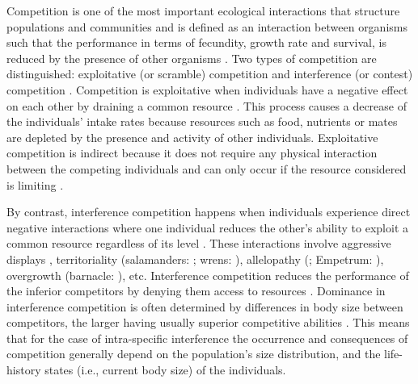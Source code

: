 Competition is one of the most important ecological interactions that structure
populations and communities and is defined as an interaction between organisms
such that the performance in terms of fecundity, growth rate and survival, is
reduced by the presence of other organisms
\autocite{volterra1931a,gause1932a,park1948a,park1954a,park1957a}. Two types of
competition are distinguished:
exploitative (or scramble) competition and interference (or contest) competition
\autocite{park1954a,park1962a,begon2009a}. Competition is exploitative when
individuals have a negative effect on each other by draining a common resource
\autocite{goss-custard1980a,vance1984a,begon2009a}. This process causes a
decrease of the individuals’ intake rates because resources such as food,
nutrients or mates \autocite{begon2009a} are depleted by the presence and activity
of other individuals. Exploitative competition is indirect because it does not
require any physical interaction between the competing individuals and can only
occur if the resource considered is limiting \autocite{begon2009a}.

By contrast, interference competition happens when individuals experience direct
negative interactions where one individual reduces the other’s ability to
exploit a common resource regardless of its level
\autocite{park1954a,vance1984a}.
These interactions involve aggressive displays \autocite{schoener1976a},
territoriality (salamanders: \textcite{walls1990a}; wrens:
\textcite{kennedy1996a}), allelopathy (\textcite{harper1977a,rice1984a};
Empetrum: \textcite{nilsson1994a}), overgrowth (barnacle:
\textcite{connell1961a,paine1966a}), etc.
Interference competition reduces the performance of the inferior competitors by
denying them access to resources \autocite{schoener1983a,thompson1993a}.
Dominance in interference competition is often determined by differences in body
size between competitors, the larger having usually superior competitive
abilities \autocite{mccormick2012a}. This means that for the case of
intra-specific interference the occurrence and consequences of competition
generally depend on the population’s size distribution, and the life-history
states (i.e., current body size) of the individuals.

